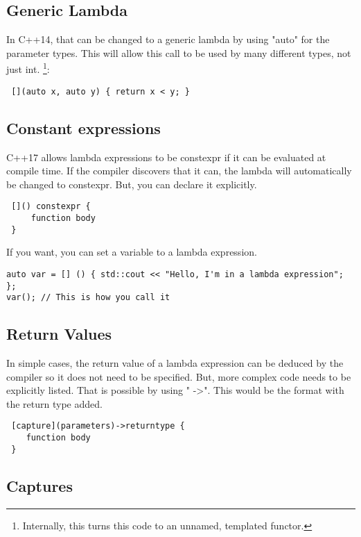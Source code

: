 \subsection{Generic Lambda}
In C++14, that can be changed to a generic lambda by using "auto" for the parameter types. This will allow this call to be used by many different types, not just int. \footnote{Internally, this turns this code to an unnamed, templated functor.}:

\begin{lstlisting}
 [](auto x, auto y) { return x < y; }    
\end{lstlisting}

\subsection{Constant expressions}
C++17 allows lambda expressions to be constexpr if it can be evaluated at compile time. If the compiler discovers that it can, the lambda will automatically be changed to constexpr. But, you can declare it explicitly.

\begin{verbatim}
 []() constexpr {
     function body
 }    
\end{verbatim}

If you want, you can set a variable to a lambda expression. 

\begin{lstlisting}
auto var = [] () { std::cout << "Hello, I'm in a lambda expression"; };
var(); // This is how you call it
\end{lstlisting}

\subsection{Return Values}
In simple cases, the return value of a lambda expression can be deduced by the compiler so it does not need to be specified. But, more complex code needs to be explicitly listed. That is possible by using " -\textgreater ". This would be the format with the return type added.

\begin{verbatim}
 [capture](parameters)->returntype {
    function body
 }    
\end{verbatim}

\subsection{Captures}

